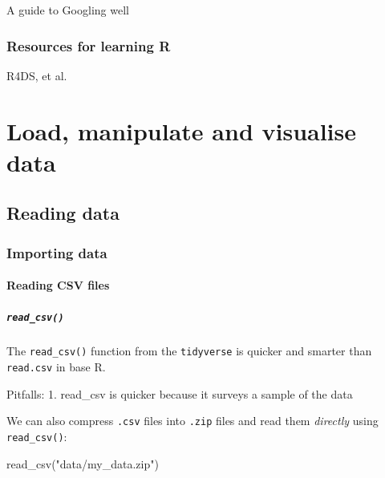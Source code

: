 \documentclass[
]{book}
\newenvironment{Shaded}{\begin{snugshade}}{\end{snugshade}}
\newcommand{\FunctionTok}[1]{\textcolor[rgb]{0.00,0.00,0.00}{#1}}
\newcommand{\NormalTok}[1]{#1}
\newcommand{\StringTok}[1]{\textcolor[rgb]{0.31,0.60,0.02}{#1}}
\begin{document}
A guide to Googling well

\hypertarget{resources-for-learning-r}{%
\section{Resources for learning R}\label{resources-for-learning-r}}

R4DS, et al.

\hypertarget{part-load-manipulate-and-visualise-data}{%
\part{Load, manipulate and visualise data}\label{part-load-manipulate-and-visualise-data}}

\hypertarget{reading-data}{%
\chapter{Reading data}\label{reading-data}}

\hypertarget{importing-data}{%
\section{Importing data}\label{importing-data}}

\hypertarget{reading-csv-files}{%
\subsection{Reading CSV files}\label{reading-csv-files}}

\hypertarget{read_csv}{%
\subsubsection{\texorpdfstring{\texttt{read\_csv()}}{read\_csv()}}\label{read_csv}}

The \texttt{read\_csv()} function from the \texttt{tidyverse} is quicker and smarter than \texttt{read.csv} in base R.

Pitfalls:
1. read\_csv is quicker because it surveys a sample of the data

We can also compress \texttt{.csv} files into \texttt{.zip} files and read them \emph{directly} using \texttt{read\_csv()}:

\begin{Shaded}
\begin{Highlighting}[]
\FunctionTok{read\_csv}\NormalTok{(}\StringTok{"data/my\_data.zip"}\NormalTok{)}
\end{Highlighting}
\end{Shaded}
\end{document}
